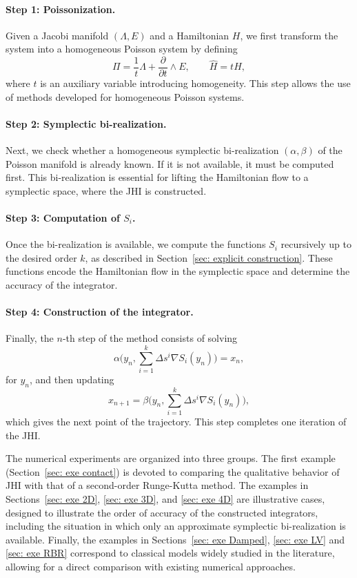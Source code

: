 \documentclass[12pt,english]{article}
\begin{document}
\paragraph{Step 1: Poissonization.} 
Given a Jacobi manifold $(\Lambda, E)$ and a Hamiltonian $H$, we first transform the system into a homogeneous Poisson system by defining
\[
\Pi = \frac{1}{t}\Lambda + \frac{\partial}{\partial t} \wedge E, \qquad \hat{H} = t H,
\]
where $t$ is an auxiliary variable introducing homogeneity. This step allows the use of methods developed for homogeneous Poisson systems.

\paragraph{Step 2: Symplectic bi-realization.} 
Next, we check whether a homogeneous symplectic bi-realization $(\alpha, \beta)$ of the Poisson manifold is already known. If it is not available, it must be computed first. This bi-realization is essential for lifting the Hamiltonian flow to a symplectic space, where the JHI is constructed.

\paragraph{Step 3: Computation of $S_i$.} 
Once the bi-realization is available, we compute the functions $S_i$ recursively up to the desired order $k$, as described in Section~\ref{sec: explicit construction}. These functions encode the Hamiltonian flow in the symplectic space and determine the accuracy of the integrator.

\paragraph{Step 4: Construction of the integrator.} 
Finally, the $n$-th step of the method consists of solving
\[
\alpha\Big(y_n, \sum_{i=1}^k \Delta s^i \nabla S_i(y_n)\Big) = x_n,
\]
for $y_n$, and then updating
\[
x_{n+1} = \beta\Big(y_n, \sum_{i=1}^k \Delta s^i \nabla S_i(y_n)\Big),
\]
which gives the next point of the trajectory. This step completes one iteration of the JHI.

The numerical experiments are organized into three groups.  
The first example (Section~\ref{sec: exe contact}) is devoted to comparing the qualitative behavior of JHI with that of a second-order Runge-Kutta method.  
The examples in Sections~\ref{sec: exe 2D}, \ref{sec: exe 3D}, and \ref{sec: exe 4D} are illustrative cases, designed to illustrate the order of accuracy of the constructed integrators, including the situation in which only an approximate symplectic bi-realization is available.  
Finally, the examples in Sections~\ref{sec: exe Damped}, \ref{sec: exe LV} and \ref{sec: exe RBR} correspond to classical models widely studied in the literature, allowing for a direct comparison with existing numerical approaches.
\end{document}
